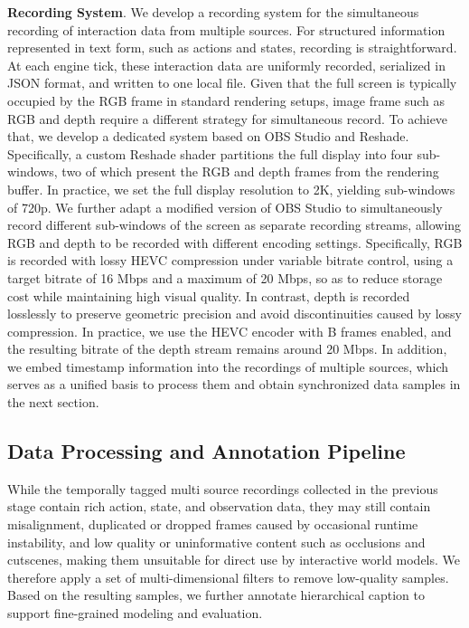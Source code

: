 \noindent
\textbf{Recording System}. We develop a recording system for the simultaneous recording of interaction data from multiple sources. 
For structured information represented in text form, such as actions and states, recording is straightforward.
At each engine tick, these interaction data are uniformly recorded, serialized in JSON format, and written to one local file.
Given that the full screen is typically occupied by the RGB frame in standard rendering setups, image frame such as RGB and depth require a different strategy for simultaneous record.
To achieve that, we develop a dedicated system based on OBS Studio and Reshade.
Specifically, a custom Reshade shader partitions the full display into four sub-windows, two of which present the RGB and depth frames from the rendering buffer.
In practice, we set the full display resolution to 2K, yielding sub-windows of 720p.
We further adapt a modified version of OBS Studio to simultaneously record different sub-windows of the screen as separate recording streams, allowing RGB and depth to be recorded with different encoding settings.
Specifically, RGB is recorded with lossy HEVC compression under variable bitrate control, using a target bitrate of 16 Mbps and a maximum of 20 Mbps, so as to reduce storage cost while maintaining high visual quality.
In contrast, depth is recorded losslessly to preserve geometric precision and avoid discontinuities caused by lossy compression.
In practice, we use the HEVC encoder with B frames enabled, and the resulting bitrate of the depth stream remains around 20 Mbps.
In addition, we embed timestamp information into the recordings of multiple sources, which serves as a unified basis to process them and obtain synchronized data samples in the next section. 

\subsection{Data Processing and Annotation Pipeline}

While the temporally tagged multi source recordings collected in the previous stage contain rich action, state, and observation data, they may still contain misalignment, duplicated or dropped frames caused by occasional runtime instability, and low quality or uninformative content such as occlusions and cutscenes, making them unsuitable for direct use by interactive world models.
We therefore apply a set of multi-dimensional filters to remove low-quality samples.
Based on the resulting samples, we further annotate hierarchical caption to support fine-grained modeling and evaluation.

